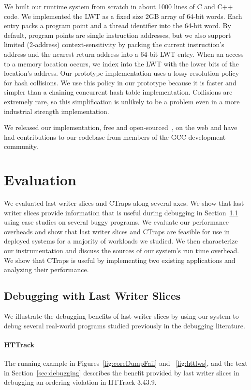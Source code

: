 \documentclass[preprint,9pt]{sigplanconf}
\newcommand{\ctraps}{CTraps\xspace}
\begin{document}
We built our runtime system from scratch in about 1000 lines of C and C++ code.
We implemented the LWT as a fixed size 2GB array of 64-bit words.  Each entry
packs a program point and a thread identifier into the 64-bit word.  By
default, program points are single instruction addresses, but we also support
limited (2-address) context-sensitivity by packing the current instruction's
address and the nearest return address into a 64-bit LWT entry. When an access
to a memory location occurs, we index into the LWT with the lower bits of the
location's address.  Our prototype implementation uses a lossy resolution
policy for hash collisions.  We use this policy in our prototype because it is
faster and simpler than a chaining concurrent hash table implementation.
Collisions are extremely rare, so this simplification is unlikely to be a
problem even in a more industrial strength implementation.  

We released our implementation, free and open-sourced~\cite{ctrapsonweb}, on
the web and have had contributions to our codebase from members of the GCC
development community.

\section{Evaluation}
\label{sec:eval}
We evaluated last writer slices and \ctraps along several axes.  We show that
last writer slices provide information that is useful during debugging in
Section~\ref{sec:eval:debugging} using case studies on several buggy programs.
We evaluate our performance overheads and show that last writer slices and
\ctraps are feasible for use in deployed systems for a majority of workloads we
studied.  We then characterize our instrumentation and discuss the sources of
our system's run time overhead.   We show that \ctraps is useful by
implementing two existing applications and analyzing their performance.    

\subsection{Debugging with Last Writer Slices}
\label{sec:eval:debugging}
We illustrate the debugging benefits of last writer slices by using our system
to debug several real-world programs studied previously in the debugging
literature.    

\paragraph{HTTrack}
The running example in Figures~\ref{fig:coreDumpFail} and ~\ref{fig:httlws},
and the text in Section~\ref{sec:debugging} describes the benefit provided by
last writer slices in debugging an ordering violation in HTTrack-3.43.9.  
\end{document}
